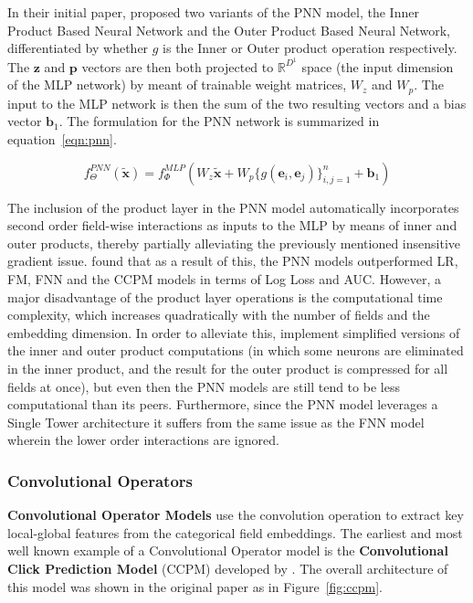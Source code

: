 \documentclass{mldsmsc}
\begin{document}
In their initial paper, \cite{RefWorks:qu2016product-based} proposed two variants of the PNN model, the Inner Product Based Neural Network
and the Outer Product Based Neural Network, differentiated by whether $g$ is the Inner or Outer
product operation respectively. The $\mathbf{z}$ and $\mathbf{p}$ vectors are then both
projected to $\mathbb{R}^{D^1}$ space (the input dimension of the MLP network) by meant
of trainable weight matrices, $W_z$ and $W_p$. The input to the MLP network is then the
sum of the two resulting vectors and a bias vector $\mathbf{b}_1$. The formulation
for the PNN network is summarized in equation~\ref{eqn:pnn}.

\begin{equation}\label{eqn:pnn}
    f_{\Theta}^{PNN}(\tilde{\mathbf{x}}) = f_{\Phi}^{MLP}(W_z \tilde{\mathbf{x}} + W_p \{g(\mathbf{e}_i, \mathbf{e}_j)\}_{i,j=1}^{n} + \mathbf{b}_1)
\end{equation}

The inclusion of the product layer in the PNN model automatically incorporates second order field-wise
interactions as inputs to the MLP by means of inner and outer products, thereby partially alleviating
the previously mentioned insensitive gradient issue. \cite{RefWorks:qu2016product-based} found that
as a result of this, the PNN models outperformed LR, FM, FNN and the CCPM models in terms of Log Loss
and AUC. However, a major disadvantage of the product layer operations is the computational time complexity,
which increases quadratically with the number of fields and the embedding dimension. In order to alleviate
this, \cite{RefWorks:qu2016product-based} implement simplified versions of the inner and outer product
computations (in which some neurons are eliminated in the inner product, and the result for the outer product
is compressed for all fields at once), but even then the PNN models are still tend to be less computational
than its peers. Furthermore, since the PNN model leverages a Single Tower architecture it suffers from the
same issue as the FNN model wherein the lower order interactions are ignored.

\subsubsection{Convolutional Operators}

\textbf{Convolutional Operator Models} use the convolution operation to extract key local-global
features from the categorical field embeddings. The earliest and most well known example of a
Convolutional Operator model is the \textbf{Convolutional Click Prediction Model} (CCPM)
developed by \cite{RefWorks:liu2015convolutional}. The overall architecture of this model
was shown in the original paper as in Figure~\ref{fig:ccpm}.
\end{document}
